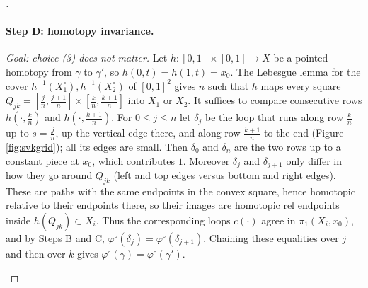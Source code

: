 \begin{proof}[]
  \paragraph{Step D: homotopy invariance.} \emph{Goal: choice (3) does not matter.} Let $h:[0,1]\times[0,1]\to X$ be a pointed homotopy from $\gamma$ to $\gamma'$, so $h(0,t)=h(1,t)=x_0$. The Lebesgue lemma for the cover $h^{-1}(X_1^\circ),h^{-1}(X_2^\circ)$ of $[0,1]^2$ gives $n$ such that $h$ maps every square $Q_{jk}=[\frac jn,\frac{j+1}n]\times[\frac kn,\frac{k+1}n]$ into $X_1$ or $X_2$. It suffices to compare consecutive rows $h(\cdot,\frac kn)$ and $h(\cdot,\frac{k+1}n)$. For $0\le j\le n$ let $\delta_j$ be the loop that runs along row $\frac kn$ up to $s=\frac jn$, up the vertical edge there, and along row $\frac{k+1}n$ to the end (Figure \ref{fig:svkgrid}); all its edges are small. Then $\delta_0$ and $\delta_n$ are the two rows up to a constant piece at $x_0$, which contributes $1$. Moreover $\delta_j$ and $\delta_{j+1}$ only differ in how they go around $Q_{jk}$ (left and top edges versus bottom and right edges). These are paths with the same endpoints in the convex square, hence homotopic relative to their endpoints there, so their images are homotopic rel endpoints inside $h(Q_{jk})\subset X_i$. Thus the corresponding loops $c(\cdot)$ agree in $\pi_1(X_i,x_0)$, and by Steps B and C, $\varphi^\circ(\delta_j)=\varphi^\circ(\delta_{j+1})$. Chaining these equalities over $j$ and then over $k$ gives $\varphi^\circ(\gamma)=\varphi^\circ(\gamma')$.
  \begin{figureBox}
\end{figureBox}
\end{proof}
